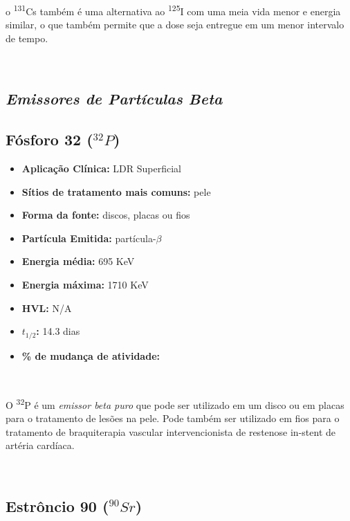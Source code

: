\documentclass[11pt,a4paper]{article}
\begin{document}
			o \textsuperscript{131}Cs também é uma alternativa ao \textsuperscript{125}I com uma meia vida menor e energia similar, o que também permite que a dose seja entregue em um menor intervalo de tempo.

			\

		\subsection*{\textbf{\textit{\textcolor{CarnationPink}{Emissores de Partículas Beta}}}}


		\subsection{Fósforo 32 \textbf{\textcolor{CarnationPink}{(${}^{32}P$)}}}

			\begin{itemize}
				\item \textbf{Aplicação Clínica:} LDR Superficial
				\item \textbf{Sítios de tratamento mais comuns:} pele
				\item \textbf{Forma da fonte:} discos, placas ou fios
				\item \textbf{Partícula Emitida:} partícula-$\beta$
				\item \textbf{Energia média: } 695 KeV
				\item \textbf{Energia máxima: } 1710 KeV
				\item \textbf{HVL:} N/A
				\item \textbf{$t_{1/2}$:} 14.3 dias
				\item \textbf{\% de mudança de atividade: } 
			\end{itemize}

			\

			O \textsuperscript{32}P é um \textit{\textcolor{CarnationPink}{emissor beta puro}} que pode ser utilizado em um disco ou em placas para o tratamento de lesões na pele. Pode também ser utilizado em fios para o tratamento de braquiterapia vascular intervencionista de restenose in-stent de artéria cardíaca.

			\

		\subsection{Estrôncio 90 \textbf{\textcolor{CarnationPink}{(${}^{90}Sr$)}}}
\end{document}
